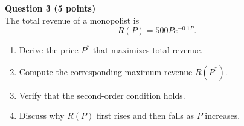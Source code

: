 \documentclass[12pt]{article}
\begin{document}
\vspace{1em}

\textbf{Question 3 (5 points)}\\
The total revenue of a monopolist is  
\[
R(P)=500P e^{-0.1P}.
\]
\begin{enumerate}
\item Derive the price \(P^*\) that maximizes total revenue.  
\item Compute the corresponding maximum revenue \(R(P^*)\).  
\item Verify that the second-order condition holds.  
\item Discuss why \(R(P)\) first rises and then falls as \(P\) increases.  
\end{enumerate}
\end{document}
